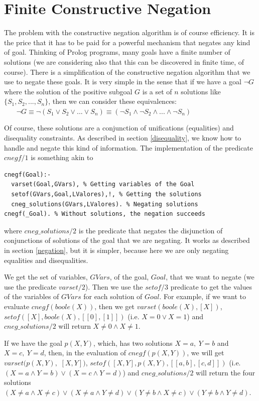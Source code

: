 \documentclass{tlp}
\begin{document}
\section{Finite Constructive Negation}
\label{cnegf}

The problem with the constructive negation algorithm is of course
efficiency. It is the price that it has to be paid for a powerful
mechanism that negates any kind of goal. Thinking of Prolog programs,
many goals have a finite number of solutions (we are considering also
that this can be discovered in finite time, of course). There is a
simplification of the constructive negation algorithm that we use to
negate these goals. It is very simple in the sense that if we have a
goal $\neg G$ where the solution of the positive subgoal $G$ is a set
of $n$ solutions like $\{S_1, S_2,...,S_n\}$, then we can consider
these equivalences: %
$~~~~~~~~\neg G \equiv \neg(S_1 \vee S_2 \vee ... \vee S_n) 
 \equiv (\neg S_1 \wedge \neg S_2 \wedge ... \wedge \neg S_n)$

Of course, these solutions are a conjunction of unifications
(equalities) and disequality constraints. As described in section
\ref{disequality}, we know how to handle and negate this kind of
information. The implementation of the predicate $cnegf/1$ is
something akin to

{
\begin{verbatim}
cnegf(Goal):-
  varset(Goal,GVars), % Getting variables of the Goal
  setof(GVars,Goal,LValores),!, % Getting the solutions
  cneg_solutions(GVars,LValores). % Negating solutions
cnegf(_Goal). % Without solutions, the negation succeeds
\end{verbatim}
}
\noindent
where $cneg\_solutions/2$ is the predicate that negates the disjunction
of conjunctions of solutions of the goal that we are negating. It
works as described in section \ref{negation}, but it is simpler,
because here we are only negating equalities and disequalities.

We get the set of variables, $GVars$, of the goal, $Goal$, that we
want to negate (we use the predicate $varset/2$). Then we use the
$setof/3$ predicate to get the values of the variables of $GVars$
 for each solution of $Goal$. For example, if we want to
evaluate $cnegf(boole(X))$, then we get $varset(boole(X),[X])$,
$setof([X],boole(X),[[0],[1]])$ (i.e. $X=0 \vee X=1$) and
$cneg\_solutions/2$ will return $X \neq 0
\wedge X \neq 1$. 

If we have the goal $p(X,Y)$, which, has two solutions $X=a,~Y=b$ and
$X=c,~Y=d$, then, in the evaluation of $cnegf(p(X,Y))$, we will get
$varset(p(X,Y),$ $[X,Y])$, $setof([X,Y],p(X,Y),[[a,b],[c,d]])$
(i.e. $(X=a \wedge Y=b) \vee (X=c \wedge Y=d)$) and $cneg\_solutions/2$
will return the four solutions $(X \neq a \wedge X \neq c) \vee (X
\neq a \wedge Y \neq d) \vee (Y \neq b \wedge X \neq c) \vee (Y \neq b
\wedge Y \neq d)$.
\end{document}
